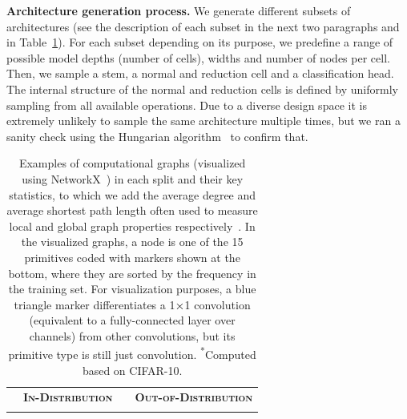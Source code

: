 \textbf{Architecture generation process.} We generate different subsets of architectures (see the description of each subset in the next two paragraphs and in Table~\ref{tab:graphs}). For each subset depending on its purpose, we predefine a range of possible model depths (number of cells), widths and number of nodes per cell. Then, we sample a stem, a normal and reduction cell and a classification head. The internal structure of the normal and reduction cells is defined by uniformly sampling from all available operations. 
Due to a diverse design space it is extremely unlikely to sample the same architecture multiple times, but we ran a sanity check using the Hungarian algorithm~\citep{kuhn1955hungarian} to confirm that.

\begin{table}[t!]
	\centering
	\vspace{-10pt}
	\caption{\small Examples of computational graphs (visualized using NetworkX~\citep{hagberg2008exploring}) in each split and their key statistics, to which we add the average degree and average shortest path length often used to measure local and global graph properties respectively~\citep{barrat2004architecture,you2020graph}. In the visualized graphs, a node is one of the 15 primitives coded with markers shown at the bottom, where they are sorted by the frequency in the training set. For visualization purposes, a blue triangle marker differentiates a 1${\mkern-0.1mu\times\mkern-0.1mu}$1 convolution (equivalent to a fully-connected layer over channels) from other convolutions, but its primitive type is still just convolution. \textsuperscript{*}Computed based on CIFAR-10.			
	}
	\vspace{-5pt}
	\label{tab:graphs}
	\tiny
	\newcommand{\width}{0.135\textwidth}
	\setlength{\tabcolsep}{0pt}
	\begin{tabular}{p{1.7cm}ccp{0.2cm}ccccc}
		\toprule
		& \multicolumn{2}{c}{{\small \textbf{\textsc{In-Distribution}}}} & &
		\multicolumn{5}{c}{{\small \textbf{\textsc{Out-of-Distribution}}}}
		\Bstrut\Tstrut\\
		\cline{2-3}\cline{5-9} \\[-2ex]

\end{tabular}
\end{table}
